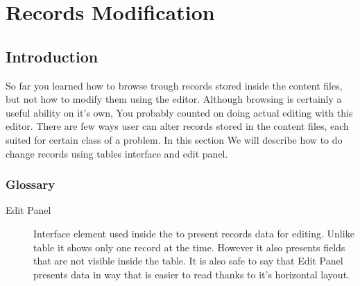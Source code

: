 \section{Records Modification}

\subsection{Introduction}
So far you learned how to browse trough records stored inside the content files, but not how to modify them using the \OCS{} editor. Although browsing is certainly a useful ability on it's own, You probably counted on doing actual editing with this editor. There are few ways user can alter records stored in the content files, each suited for certain class of a problem. In this section We will describe how to do change records using tables interface and edit panel.

\subsubsection{Glossary}
\begin{description}
  \item[Edit Panel] Interface element used inside the \OCS{} to present records data for editing. Unlike table it shows only one record at the time. However it also presents fields that are not visible inside the table. It is also safe to say that Edit Panel presents data in way that is easier to read thanks to it's horizontal layout.
\end{description}

